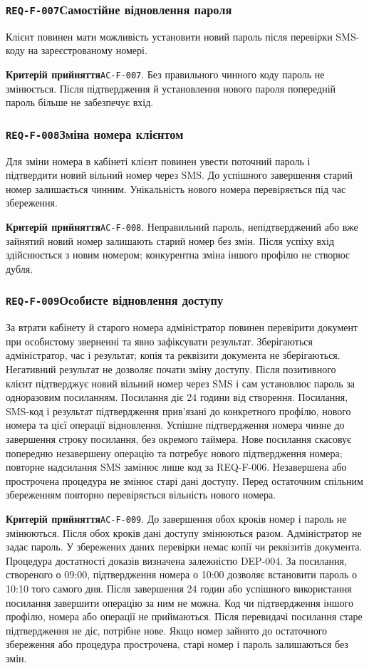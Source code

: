 \documentclass[11pt,a4paper]{article}
\newcommand{\requirement}[4]{%
  \Needspace{7\baselineskip}%
  \subsubsection*{\hypertarget{#1}{\texttt{#1}}\quad #2}%
  #3\par
  \textbf{Критерій прийняття}\quad #4\par\medskip}
\begin{document}
\requirement{REQ-F-007}{Самостійне відновлення пароля}{Клієнт повинен мати можливість установити новий пароль після перевірки SMS-коду на зареєстрованому номері.}{\hypertarget{AC-F-007}{\texttt{AC-F-007}}. Без правильного чинного коду пароль не змінюється. Після підтвердження й установлення нового пароля попередній пароль більше не забезпечує вхід.}

\requirement{REQ-F-008}{Зміна номера клієнтом}{Для зміни номера в кабінеті клієнт повинен увести поточний пароль і підтвердити новий вільний номер через SMS. До успішного завершення старий номер залишається чинним. Унікальність нового номера перевіряється під час збереження.}{\hypertarget{AC-F-008}{\texttt{AC-F-008}}. Неправильний пароль, непідтверджений або вже зайнятий новий номер залишають старий номер без змін. Після успіху вхід здійснюється з новим номером; конкурентна зміна іншого профілю не створює дубля.}

\requirement{REQ-F-009}{Особисте відновлення доступу}{За втрати кабінету й старого номера адміністратор повинен перевірити документ при особистому зверненні та явно зафіксувати результат. Зберігаються адміністратор, час і результат; копія та реквізити документа не зберігаються. Негативний результат не дозволяє почати зміну доступу. Після позитивного клієнт підтверджує новий вільний номер через SMS і сам установлює пароль за одноразовим посиланням. Посилання діє 24 години від створення. Посилання, SMS-код і результат підтвердження прив’язані до конкретного профілю, нового номера та цієї операції відновлення. Успішне підтвердження номера чинне до завершення строку посилання, без окремого таймера. Нове посилання скасовує попередню незавершену операцію та потребує нового підтвердження номера; повторне надсилання SMS замінює лише код за REQ-F-006. Незавершена або прострочена процедура не змінює старі дані доступу. Перед остаточним спільним збереженням повторно перевіряється вільність нового номера.}{\hypertarget{AC-F-009}{\texttt{AC-F-009}}. До завершення обох кроків номер і пароль не змінюються. Після обох кроків дані доступу змінюються разом. Адміністратор не задає пароль. У збережених даних перевірки немає копії чи реквізитів документа. Процедура достатності доказів визначена залежністю DEP-004. За посилання, створеного о 09:00, підтвердження номера о 10:00 дозволяє встановити пароль о 10:10 того самого дня. Після завершення 24 годин або успішного використання посилання завершити операцію за ним не можна. Код чи підтвердження іншого профілю, номера або операції не приймаються. Після перевидачі посилання старе підтвердження не діє, потрібне нове. Якщо номер зайнято до остаточного збереження або процедура прострочена, старі номер і пароль залишаються без змін.}
\end{document}
